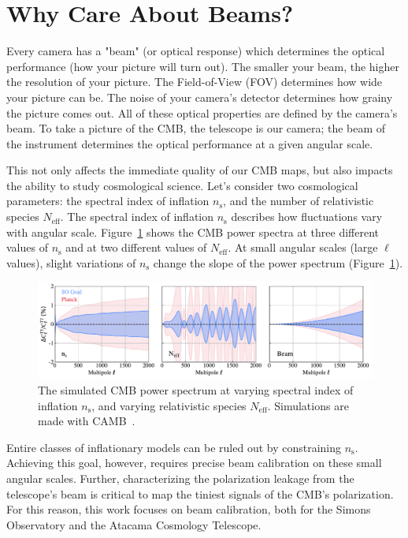 \section{Why Care About Beams?}
Every camera has a "beam" (or optical response) which determines the optical performance (how your picture will turn out).  The smaller your beam, the higher the resolution of your picture.   The Field-of-View (FOV) determines how wide your picture can be.  The noise of your camera's detector determines how grainy the picture comes out.  All of these optical properties are defined by the camera's beam.  To take a picture of the CMB, the telescope is our camera; the beam of the instrument determines the optical performance at a given angular scale.  

This not only affects the immediate quality of our CMB maps, but also impacts the ability to study cosmological science.  Let's consider two cosmological parameters: the spectral index of inflation $n_{\text{s}}$, and the number of relativistic species $N_{\text{eff}}$.  The spectral index of inflation $n_{\text{s}}$ describes how fluctuations vary with angular scale.  Figure~\ref{fig:cmb_ns} shows the CMB power spectra at three different values of $n_{\text{s}}$ and at two different values of $N_{\text{eff}}$.  At small angular scales (large $\ell$ values), slight variations of $n_{\text{s}}$ change the slope of the power spectrum (Figure~\ref{fig:cmb_ns}).

\begin{figure}[t!]
    \centering
    \includegraphics[width = \textwidth]{Figures/beam_neff.pdf}
    \caption{The simulated CMB power spectrum at varying spectral index of inflation $n_\text{s}$, and varying relativistic species $N_{\text{eff}}$.  Simulations are made with CAMB~\cite{camb_online}.}
    \label{fig:cmb_ns}
\end{figure}

Entire classes of inflationary models can be ruled out by constraining $n_{\text{s}}$.  Achieving this goal, however, requires precise beam calibration on these small angular scales.  Further, characterizing the polarization leakage from the telescope's beam is critical to map the tiniest signals of the CMB's polarization.  For this reason, this work focuses on beam calibration, both for the Simons Observatory and the Atacama Cosmology Telescope.

